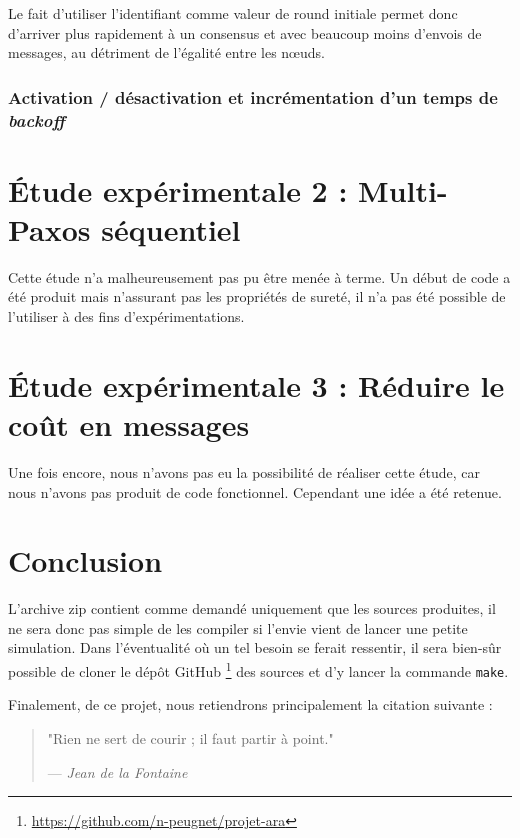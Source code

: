 \documentclass[french]{article}
\begin{document}
Le fait d'utiliser l'identifiant comme valeur de round initiale permet donc d'arriver plus rapidement à un consensus et avec beaucoup moins d'envois de messages,
au détriment de l'égalité entre les nœuds.

\subsubsection{Activation / désactivation et incrémentation d'un temps de \emph{backoff}}





\section{Étude expérimentale 2 : Multi-Paxos séquentiel}

Cette étude n'a malheureusement pas pu être menée à terme.
Un début de code a été produit mais n'assurant pas les propriétés de sureté, il n'a pas été possible de l'utiliser à des fins d'expérimentations.

\section{Étude expérimentale 3 : Réduire le coût en messages}

Une fois encore, nous n'avons pas eu la possibilité de réaliser cette étude, car nous n'avons pas produit de code fonctionnel.
Cependant une idée a été retenue.

\section*{Conclusion}

L'archive zip contient comme demandé uniquement que les sources produites, il ne sera donc pas simple de les compiler si l'envie vient de lancer une petite simulation.
Dans l'éventualité où un tel besoin se ferait ressentir, il sera bien-sûr possible de cloner le dépôt GitHub
\footnote{\url{https://github.com/n-peugnet/projet-ara}}
des sources et d'y lancer la commande \lstinline{make}.

Finalement, de ce projet, nous retiendrons principalement la citation suivante :

\begin{quotation}
	"Rien ne sert de courir ; il faut partir à point."

	--- \emph{Jean de la Fontaine}
\end{quotation}
\end{document}
